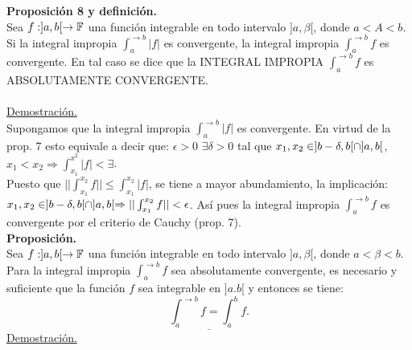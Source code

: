 \textbf{Proposición 8 y definición.}\\
Sea $f:]a,b[ \rightarrow \mathbb{F}$ una función integrable en todo intervalo $]a,\beta[$, donde $a<A<b$.\\
Si la integral impropia $\int_a^{\to b} |f|$ es convergente, la integral impropia $\int_a^{\to b}f$ es convergente. En tal caso se dice que la INTEGRAL IMPROPIA $\int_a^{\to b}f$ es ABSOLUTAMENTE CONVERGENTE.\\ \\
\underline{Demostración.}\\
Supongamos que la integral impropia $\int_a^{\to b}|f|$ es convergente. En virtud de la prop. 7 esto equivale a decir que: 
\todo \phantom{} $\epsilon >0$ $\exists \delta>0$ tal que $x_1,x_2 \in ]b-\delta,b [ \cap ]a,b[$, $x_1 <x_2 \Rightarrow \int_{x_1}^{x^2}|f| < \exists$.\\
Puesto que $|| \int_{x_1}^{x_2}f || \leq \int_{x_1}^{x_2}|f|$, se tiene a mayor abundamiento, la implicación:\\
 $x_1,x_2 \in ]b-\delta,b [ \cap ]a,b[ \Rightarrow || \int_{x_1}^{x_2}f || < \epsilon$. Así pues la integral impropia $\int_a^{\to b}f$ es convergente por el criterio de Cauchy (prop. 7).\\
\textbf{Proposición.}\\
Sea $f:]a,b[ \rightarrow \mathbb{F}$ una función integrable en todo intervalo $]a,\beta [$, donde $a<\beta <b$. Para la integral impropia $\int_a^{\to b}f$ sea absolutamente convergente, es necesario y suficiente que la función $f$ sea integrable en $]a.b[$ y entonces se tiene:\\
$$
\underline{\int_a^{\to b}f=\int_a^b f.}
$$
\underline{Demostración.}\\
